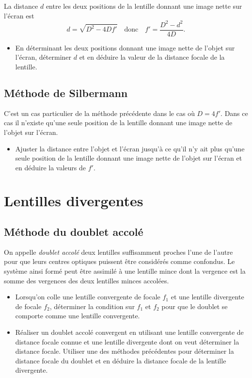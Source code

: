 \documentclass[a4paper]{tp}
\begin{document}
La distance $d$ entre les deux positions de la lentille donnant une image nette sur l'écran est 
\begin{equation*}
  d = \sqrt{D^2-4Df'} \quad \text{donc} \quad f' = \frac{D^2-d^2}{4D}.
\end{equation*}

\begin{itemize}
  \item En déterminant les deux positions donnant une image nette de l'objet sur l'écran, déterminer $d$ et en déduire la valeur de la distance focale de la lentille.
\end{itemize}

\subsection{Méthode de Silbermann}%
\label{sub:methode_de_silbermann}
C'est un cas particulier de la méthode précédente dans le cas où $D=4f'$. Dans ce cas il n'existe qu'une seule position de la lentille donnant une image nette de l'objet sur l'écran.


\begin{itemize}
  \item Ajuster la distance entre l'objet et l'écran jusqu'à ce qu'il n'y ait plus qu'une seule position de la lentille donnant une image nette de l'objet sur l'écran et en déduire la valeurs de $f'$.
\end{itemize}

\section{Lentilles divergentes}%
\label{sec:lentilles_divergentes}

\subsection{Méthode du doublet accolé}%
\label{sub:methode_du_doublet_accole}

On appelle \emph{doublet accolé} deux lentilles suffisamment proches l'une de l'autre pour que leurs centres optiques puissent être considérés comme confondus. Le système ainsi formé peut être assimilé à une lentille mince dont la vergence est la somme des vergences des deux lentilles minces accolées.

\begin{itemize}
  \item Lorsqu'on colle une lentille convergente de focale $f_1$ et une lentille divergente de focale $f_2$, déterminer la condition sur $f_1$ et $f_2$ pour que le doublet se comporte comme une lentille convergente.

\item Réaliser un doublet accolé convergent en utilisant une lentille convergente de distance focale connue et une lentille divergente dont on veut déterminer la distance focale. Utiliser une des méthodes précédentes pour déterminer la distance focale du doublet et en déduire la distance focale de la lentille divergente. 

\end{itemize}
\end{document}
